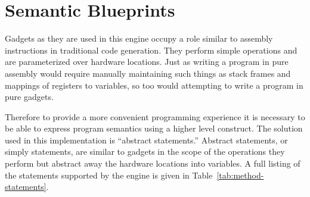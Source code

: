     \begin{table}
        \centering
        \caption[Concrete examples of gadgets.]
        {Concrete examples of gadgets along with their associated clobber set}
        \label{tab:method-clobber}
    \end{table}

    \section{Semantic Blueprints}

    Gadgets as they are used in this engine occupy a role similar to assembly
    instructions in traditional code generation. They perform simple operations
    and are parameterized over hardware locations. Just as writing a program in
    pure assembly would require manually maintaining such things as stack frames
    and mappings of registers to variables, so too would attempting to write a
    program in pure gadgets. 

    Therefore to provide a more convenient programming experience it is
    necessary to be able to express program semantics using a higher level
    construct. The solution used in this implementation is ``abstract
    statements.'' Abstract statements, or simply statements, are similar to
    gadgets in the scope of the operations they perform but abstract away the
    hardware locations into variables. A full listing of the statements
    supported by the engine is given in Table~\ref{tab:method-statements}.

